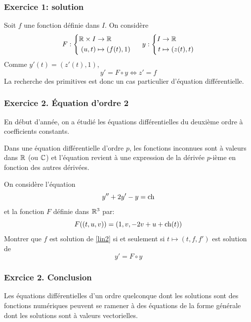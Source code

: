 \begin{frame}
\frametitle{Exercice 1: solution}
Soit $f$ une fonction définie dans $I$. On considère
\begin{displaymath}
  F :
\left\lbrace 
\begin{aligned}
  \mathbb{R} \times I &\rightarrow \mathbb{R} \\
  (u,t) &\mapsto (f(t),1) 
\end{aligned}
\right. 
\hspace{0.5cm} y:
\left\lbrace 
\begin{aligned}
  I &\rightarrow \mathbb{R} \\
  t &\mapsto (z(t),t) 
\end{aligned}
\right. 
\end{displaymath}
Comme $y'(t)=(z'(t),1)$,
\begin{displaymath}
  y' = F\circ y \Leftrightarrow z' = f
\end{displaymath}
La recherche des primitives est donc un cas particulier d'équation différentielle.
\end{frame}

\begin{frame}
  \frametitle{Exercice 2. \'Equation d'ordre 2}
En début d'année, on a étudié les équations différentielles du deuxième ordre à coefficients constants. 

Dans une équation différentielle d'ordre $p$, les fonctions inconnues sont à valeurs dans $\mathbb{R}$ (ou $\mathbb{C}$) et l'équation revient à une expression de la dérivée $p$-ième en fonction des autres dérivées.

On considère l'équation
\begin{equation}
  y'' + 2y' - y = \mathop{\mathrm{ch}}
  \label{lin2}
\end{equation}
et la fonction $F$ définie dans $\mathbb{R}^3$ par:
\begin{displaymath}
  F((t,u,v)) = (1,v,-2v+u+\mathop{\mathrm{ch}}(t))
\end{displaymath}
Montrer que $f$ est solution de \eqref{lin2} si et seulement si $t\mapsto(t,f,f')$ est solution de 
\begin{equation*}
  y' = F\circ y
\end{equation*}  
\end{frame}

\begin{frame}
  \frametitle{Exrcice 2. Conclusion}

Les équations différentielles d'un ordre quelconque dont les solutions sont des fonctions numériques peuvent se ramener à des équations de la forme générale dont les solutions sont à valeurs vectorielles.
\end{frame}

